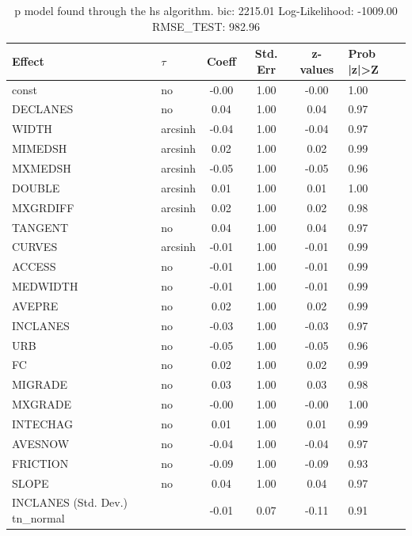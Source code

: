 \begin{table}
	\caption{p model found through the hs algorithm. bic: 2215.01 Log-Likelihood: -1009.00 RMSE_TEST: 982.96}
	\begin{center}
		\begin{tabular}{|l|l|c|c|c|l|}
			\hline
			Effect & $\tau$ & Coeff & Std. Err & z-values & Prob |z|>Z \\
			\hline
			const & no & -0.00 & 1.00 & -0.00 & 1.00 \\
			\hline
			DECLANES & no & 0.04 & 1.00 & 0.04 & 0.97 \\
			\hline
			WIDTH & arcsinh & -0.04 & 1.00 & -0.04 & 0.97 \\
			\hline
			MIMEDSH & arcsinh & 0.02 & 1.00 & 0.02 & 0.99 \\
			\hline
			MXMEDSH & arcsinh & -0.05 & 1.00 & -0.05 & 0.96 \\
			\hline
			DOUBLE & arcsinh & 0.01 & 1.00 & 0.01 & 1.00 \\
			\hline
			MXGRDIFF & arcsinh & 0.02 & 1.00 & 0.02 & 0.98 \\
			\hline
			TANGENT & no & 0.04 & 1.00 & 0.04 & 0.97 \\
			\hline
			CURVES & arcsinh & -0.01 & 1.00 & -0.01 & 0.99 \\
			\hline
			ACCESS & no & -0.01 & 1.00 & -0.01 & 0.99 \\
			\hline
			MEDWIDTH & no & -0.01 & 1.00 & -0.01 & 0.99 \\
			\hline
			AVEPRE & no & 0.02 & 1.00 & 0.02 & 0.99 \\
			\hline
			INCLANES & no & -0.03 & 1.00 & -0.03 & 0.97 \\
			\hline
			URB & no & -0.05 & 1.00 & -0.05 & 0.96 \\
			\hline
			FC & no & 0.02 & 1.00 & 0.02 & 0.99 \\
			\hline
			MIGRADE & no & 0.03 & 1.00 & 0.03 & 0.98 \\
			\hline
			MXGRADE & no & -0.00 & 1.00 & -0.00 & 1.00 \\
			\hline
			INTECHAG & no & 0.01 & 1.00 & 0.01 & 0.99 \\
			\hline
			AVESNOW & no & -0.04 & 1.00 & -0.04 & 0.97 \\
			\hline
			FRICTION & no & -0.09 & 1.00 & -0.09 & 0.93 \\
			\hline
			SLOPE & no & 0.04 & 1.00 & 0.04 & 0.97 \\
			\hline
			INCLANES (Std. Dev.) tn_normal &  & -0.01 & 0.07 & -0.11 & 0.91 \\

\end{tabular}
\end{center}
\end{table}
